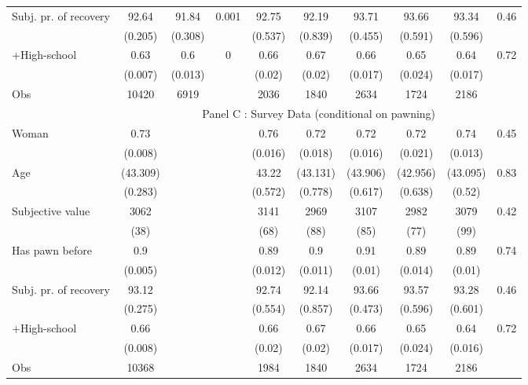 \begin{tabular}{lccccccccc}
Subj. pr. of recovery & 92.64 & 91.84 & 0.001 & 92.75 & 92.19 & 93.71 & 93.66 & 93.34 & 0.46 \\
      & (0.205) & (0.308) &       & (0.537) & (0.839) & (0.455) & (0.591) & (0.596) &  \\
+High-school & 0.63  & 0.6   & 0     & 0.66  & 0.67  & 0.66  & 0.65  & 0.64  & 0.72 \\
      & (0.007) & (0.013) &       & (0.02) & (0.02) & (0.017) & (0.024) & (0.017) &  \\
\midrule
Obs   & 10420 & 6919  &       & 2036  & 1840  & 2634  & 1724  & 2186  &  \\
\midrule
      & \multicolumn{9}{c}{Panel C : Survey Data (conditional on pawning)} \\
\midrule
Woman & 0.73  &       &       & 0.76  & 0.72  & 0.72  & 0.72  & 0.74  & 0.45 \\
      & (0.008) &       &       & (0.016) & (0.018) & (0.016) & (0.021) & (0.013) &  \\
Age   & (43.309) &       &       & 43.22 & (43.131) & (43.906) & (42.956) & (43.095) & 0.83 \\
      & (0.283) &       &       & (0.572) & (0.778) & (0.617) & (0.638) & (0.52) &  \\
Subjective value & 3062  &       &       & 3141  & 2969  & 3107  & 2982  & 3079  & 0.42 \\
      & (38)  &       &       & (68)  & (88)  & (85)  & (77)  & (99)  &  \\
Has pawn before & 0.9   &       &       & 0.89  & 0.9   & 0.91  & 0.89  & 0.89  & 0.74 \\
      & (0.005) &       &       & (0.012) & (0.011) & (0.01) & (0.014) & (0.01) &  \\
Subj. pr. of recovery & 93.12 &       &       & 92.74 & 92.14 & 93.66 & 93.57 & 93.28 & 0.46 \\
      & (0.275) &       &       & (0.554) & (0.857) & (0.473) & (0.596) & (0.601) &  \\
+High-school & 0.66  &       &       & 0.66  & 0.67  & 0.66  & 0.65  & 0.64  & 0.72 \\
      & (0.008) &       &       & (0.02) & (0.02) & (0.017) & (0.024) & (0.016) &  \\
\midrule
Obs   & 10368 &       &       & 1984  & 1840  & 2634  & 1724  & 2186  &  \\
\bottomrule
\bottomrule
\end{tabular}%
